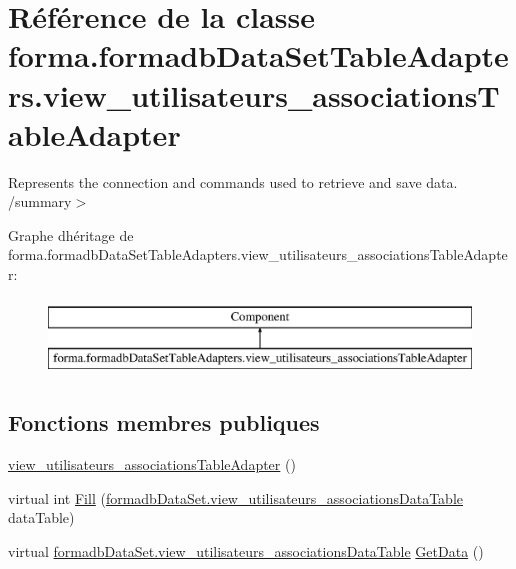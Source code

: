 \hypertarget{classforma_1_1formadb_data_set_table_adapters_1_1view__utilisateurs__associations_table_adapter}{}\section{Référence de la classe forma.\+formadb\+Data\+Set\+Table\+Adapters.\+view\+\_\+utilisateurs\+\_\+associations\+Table\+Adapter}
\label{classforma_1_1formadb_data_set_table_adapters_1_1view__utilisateurs__associations_table_adapter}


Represents the connection and commands used to retrieve and save data. /summary$>$  


Graphe d\textquotesingle{}héritage de forma.\+formadb\+Data\+Set\+Table\+Adapters.\+view\+\_\+utilisateurs\+\_\+associations\+Table\+Adapter\+:\begin{figure}[H]
\begin{center}
\leavevmode
\includegraphics[height=2.000000cm]{classforma_1_1formadb_data_set_table_adapters_1_1view__utilisateurs__associations_table_adapter}
\end{center}
\end{figure}
\subsection*{Fonctions membres publiques}
\begin{DoxyCompactItemize}
\item 
\hyperlink{classforma_1_1formadb_data_set_table_adapters_1_1view__utilisateurs__associations_table_adapter_a92fdf3e809e4b57c36aff4567203788a}{view\+\_\+utilisateurs\+\_\+associations\+Table\+Adapter} ()
\item 
virtual int \hyperlink{classforma_1_1formadb_data_set_table_adapters_1_1view__utilisateurs__associations_table_adapter_ac0f3b2aa561a92b61400c1d406fd99b3}{Fill} (\hyperlink{classforma_1_1formadb_data_set_1_1view__utilisateurs__associations_data_table}{formadb\+Data\+Set.\+view\+\_\+utilisateurs\+\_\+associations\+Data\+Table} data\+Table)
\item 
virtual \hyperlink{classforma_1_1formadb_data_set_1_1view__utilisateurs__associations_data_table}{formadb\+Data\+Set.\+view\+\_\+utilisateurs\+\_\+associations\+Data\+Table} \hyperlink{classforma_1_1formadb_data_set_table_adapters_1_1view__utilisateurs__associations_table_adapter_a195b2ec4b037bf5acdeda890f48b8af8}{Get\+Data} ()
\end{DoxyCompactItemize}
